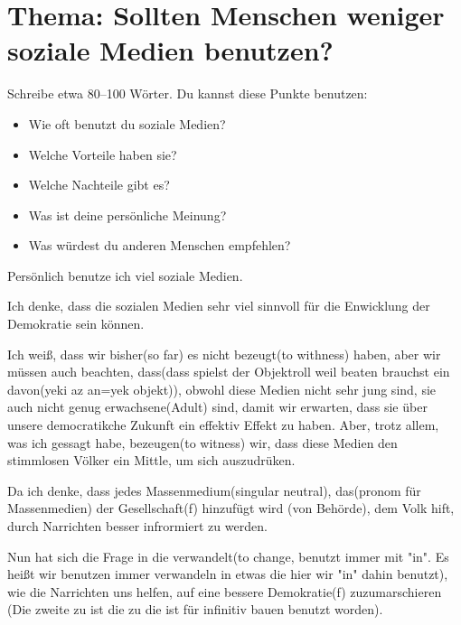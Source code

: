 \documentclass[a4paper]{article}
\title{}
\date{}
\author{Mohammad Rahmani}
\begin{document}
    \maketitle
    
    
    \section{Thema: Sollten Menschen weniger soziale Medien benutzen?}
        
        Schreibe etwa 80--100 Wörter. Du kannst diese Punkte benutzen:
        
        \begin{itemize}
            \item Wie oft benutzt du soziale Medien?
            \item Welche Vorteile haben sie?
            \item Welche Nachteile gibt es?
            \item Was ist deine persönliche Meinung?
            \item Was würdest du anderen Menschen empfehlen?
        \end{itemize}
        
        Persönlich benutze ich viel soziale Medien.
        
        Ich denke, dass die sozialen Medien sehr viel sinnvoll für die Enwicklung der Demokratie sein können.
        
        Ich weiß, dass wir bisher(so far) es nicht bezeugt(to withness) haben, aber wir müssen auch beachten, dass(dass spielst der Objektroll weil beaten brauchst ein davon(yeki az an=yek objekt)), obwohl diese Medien nicht sehr jung sind, sie auch nicht genug erwachsene(Adult) sind, damit wir erwarten, dass sie über unsere democratikche Zukunft ein effektiv Effekt zu haben.
        Aber, trotz allem, was ich gessagt habe, bezeugen(to witness) wir, dass diese Medien den stimmlosen Völker ein Mittle, um sich auszudrüken.
        
        Da ich denke, dass jedes Massenmedium(singular neutral), das(pronom für Massenmedien) der Gesellschaft(f) hinzufügt wird (von Behörde), dem Volk hift, durch Narrichten besser infrormiert zu werden.
        
        Nun hat sich die Frage in die verwandelt(to change, benutzt immer mit "in". Es heißt wir benutzen immer verwandeln in etwas die hier wir "in" dahin benutzt), wie die Narrichten uns helfen, auf eine bessere Demokratie(f) zuzumarschieren (Die zweite zu ist die zu die ist für infinitiv bauen benutzt worden).
        
\end{document}

